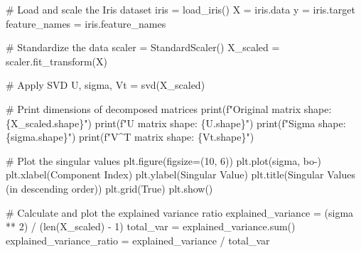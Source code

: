 \documentclass[
  letterpaper,
  DIV=11,
  numbers=noendperiod]{scrreprt}
\newenvironment{Shaded}{\begin{snugshade}}{\end{snugshade}}
\newcommand{\BuiltInTok}[1]{\textcolor[rgb]{0.00,0.23,0.31}{#1}}
\newcommand{\CommentTok}[1]{\textcolor[rgb]{0.37,0.37,0.37}{#1}}
\newcommand{\DecValTok}[1]{\textcolor[rgb]{0.68,0.00,0.00}{#1}}
\newcommand{\NormalTok}[1]{\textcolor[rgb]{0.00,0.23,0.31}{#1}}
\newcommand{\OperatorTok}[1]{\textcolor[rgb]{0.37,0.37,0.37}{#1}}
\newcommand{\SpecialCharTok}[1]{\textcolor[rgb]{0.37,0.37,0.37}{#1}}
\newcommand{\SpecialStringTok}[1]{\textcolor[rgb]{0.13,0.47,0.30}{#1}}
\newcommand{\StringTok}[1]{\textcolor[rgb]{0.13,0.47,0.30}{#1}}
\newcommand{\VariableTok}[1]{\textcolor[rgb]{0.07,0.07,0.07}{#1}}
\begin{document}
\begin{Shaded}
\begin{Highlighting}[]
\CommentTok{\# Load and scale the Iris dataset}
\NormalTok{iris }\OperatorTok{=}\NormalTok{ load\_iris()}
\NormalTok{X }\OperatorTok{=}\NormalTok{ iris.data}
\NormalTok{y }\OperatorTok{=}\NormalTok{ iris.target}
\NormalTok{feature\_names }\OperatorTok{=}\NormalTok{ iris.feature\_names}

\CommentTok{\# Standardize the data}
\NormalTok{scaler }\OperatorTok{=}\NormalTok{ StandardScaler()}
\NormalTok{X\_scaled }\OperatorTok{=}\NormalTok{ scaler.fit\_transform(X)}

\CommentTok{\# Apply SVD}
\NormalTok{U, sigma, Vt }\OperatorTok{=}\NormalTok{ svd(X\_scaled)}

\CommentTok{\# Print dimensions of decomposed matrices}
\BuiltInTok{print}\NormalTok{(}\SpecialStringTok{f"Original matrix shape: }\SpecialCharTok{\{}\NormalTok{X\_scaled}\SpecialCharTok{.}\NormalTok{shape}\SpecialCharTok{\}}\SpecialStringTok{"}\NormalTok{)}
\BuiltInTok{print}\NormalTok{(}\SpecialStringTok{f"U matrix shape: }\SpecialCharTok{\{}\NormalTok{U}\SpecialCharTok{.}\NormalTok{shape}\SpecialCharTok{\}}\SpecialStringTok{"}\NormalTok{)}
\BuiltInTok{print}\NormalTok{(}\SpecialStringTok{f"Sigma shape: }\SpecialCharTok{\{}\NormalTok{sigma}\SpecialCharTok{.}\NormalTok{shape}\SpecialCharTok{\}}\SpecialStringTok{"}\NormalTok{)}
\BuiltInTok{print}\NormalTok{(}\SpecialStringTok{f"V\^{}T matrix shape: }\SpecialCharTok{\{}\NormalTok{Vt}\SpecialCharTok{.}\NormalTok{shape}\SpecialCharTok{\}}\SpecialStringTok{"}\NormalTok{)}

\CommentTok{\# Plot the singular values}
\NormalTok{plt.figure(figsize}\OperatorTok{=}\NormalTok{(}\DecValTok{10}\NormalTok{, }\DecValTok{6}\NormalTok{))}
\NormalTok{plt.plot(sigma, }\StringTok{\textquotesingle{}bo{-}\textquotesingle{}}\NormalTok{)}
\NormalTok{plt.xlabel(}\StringTok{\textquotesingle{}Component Index\textquotesingle{}}\NormalTok{)}
\NormalTok{plt.ylabel(}\StringTok{\textquotesingle{}Singular Value\textquotesingle{}}\NormalTok{)}
\NormalTok{plt.title(}\StringTok{\textquotesingle{}Singular Values (in descending order)\textquotesingle{}}\NormalTok{)}
\NormalTok{plt.grid(}\VariableTok{True}\NormalTok{)}
\NormalTok{plt.show()}

\CommentTok{\# Calculate and plot the explained variance ratio}
\NormalTok{explained\_variance }\OperatorTok{=}\NormalTok{ (sigma }\OperatorTok{**} \DecValTok{2}\NormalTok{) }\OperatorTok{/}\NormalTok{ (}\BuiltInTok{len}\NormalTok{(X\_scaled) }\OperatorTok{{-}} \DecValTok{1}\NormalTok{)}
\NormalTok{total\_var }\OperatorTok{=}\NormalTok{ explained\_variance.}\BuiltInTok{sum}\NormalTok{()}
\NormalTok{explained\_variance\_ratio }\OperatorTok{=}\NormalTok{ explained\_variance }\OperatorTok{/}\NormalTok{ total\_var}


\end{Highlighting}
\end{Shaded}
\end{document}
